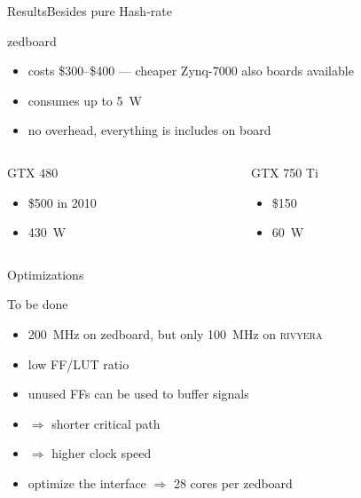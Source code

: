 \begin{frame}{Results}{Besides pure Hash-rate}
    \begin{block}{zedboard}
      \begin{itemize}
        \item costs \$300--\$400 --- cheaper Zynq-7000 also boards available
        \item consumes up to \SI{5}{\watt}
        \item no overhead, everything is includes on board
      \end{itemize}
    \end{block}
\begin{columns}[T]
  \begin{column}{.45\textwidth}
    \begin{block}{GTX 480}
      \begin{itemize}
        \item \$500 in 2010
        \item \SI{430}{\watt}
      \end{itemize}
    \end{block}
  \end{column}
  \begin{column}{.45\textwidth}
    \begin{block}{GTX 750 Ti}
      \begin{itemize}
        \item \$150
        \item \SI{60}{\watt}
      \end{itemize}
    \end{block}
  \end{column}
\end{columns}
\end{frame}
\note{}

\begin{frame}{Optimizations}
    \begin{block}{To be done}
      \begin{itemize}
          \item \SI{200}{\mega\hertz} on zedboard, but only \SI{100}{\mega\hertz} on \textsc{rivyera}
          \item low FF/LUT ratio
          \item unused FFs can be used to buffer signals
          \item[] $\Rightarrow$ shorter critical path
          \item[] $\Rightarrow$ higher clock speed
          \item optimize the interface $\Rightarrow$ 28 cores per zedboard
      \end{itemize}
    \end{block}
\end{frame}
\note{}